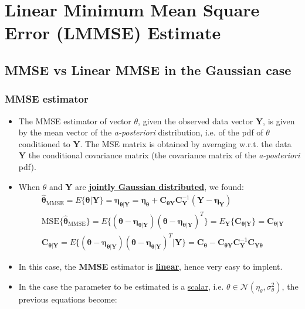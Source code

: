 \section{Linear Minimum Mean Square Error (LMMSE) Estimate}
\subsection{MMSE vs Linear MMSE in the Gaussian case}
\subsubsection{MMSE estimator}
\begin{itemize}
    \item The MMSE estimator of vector \(\theta\), given the observed data vector \textbf{Y}, is given by the mean vector of the \textit{a-posteriori} distribution, i.e. of the pdf of \(\theta\) conditioned to \textbf{Y}. The MSE matrix is obtained by averaging w.r.t. the data \textbf{Y} the conditional covariance matrix (the covariance matrix of the \textit{a-posteriori} pdf).
    \item When \(\theta\) and \textbf{Y} are \underline{\textbf{jointly Gaussian distributed}}, we found:
\begin{align*}
&\hat{\boldsymbol{\theta}}_{\text{MMSE}} = E\{\boldsymbol{\theta} | \mathbf{Y}\} = \boldsymbol{\eta}_{\boldsymbol{\theta}|\mathbf{Y}} = \boldsymbol{\eta}_{\boldsymbol{\theta}} + \mathbf{C}_{\boldsymbol{\theta}\mathbf{Y}}\mathbf{C}_{\mathbf{Y}}^{-1}(\mathbf{Y} - \boldsymbol{\eta}_{\mathbf{Y}}) \\[8pt]
&\text{MSE}\{\hat{\boldsymbol{\theta}}_{\text{MMSE}}\} = E\{(\boldsymbol{\theta} - \boldsymbol{\eta}_{\boldsymbol{\theta}|\mathbf{Y}})(\boldsymbol{\theta} - \boldsymbol{\eta}_{\boldsymbol{\theta}|\mathbf{Y}})^T\} = E_{\mathbf{Y}}\{\mathbf{C}_{\boldsymbol{\theta}|\mathbf{Y}}\} = \mathbf{C}_{\boldsymbol{\theta}|\mathbf{Y}} \\[8pt]
&\mathbf{C}_{\boldsymbol{\theta}|\mathbf{Y}} = E\{(\boldsymbol{\theta} - \boldsymbol{\eta}_{\boldsymbol{\theta}|\mathbf{Y}})(\boldsymbol{\theta} - \boldsymbol{\eta}_{\boldsymbol{\theta}|\mathbf{Y}})^T | \mathbf{Y}\} = \mathbf{C}_{\boldsymbol{\theta}} - \mathbf{C}_{\boldsymbol{\theta}\mathbf{Y}}\mathbf{C}_{\mathbf{Y}}^{-1}\mathbf{C}_{\mathbf{Y}\boldsymbol{\theta}}
\end{align*}
    \item In this case, the \textbf{MMSE} estimator is \underline{\textbf{linear}}, hence very easy to implent.
    \item In the case the parameter to be estimated is a \underline{scalar}, i.e. \(\theta\in\mathcal{N}(\eta_{\theta},\sigma_{\theta}^2)\), the previous equations become:

\end{itemize}
